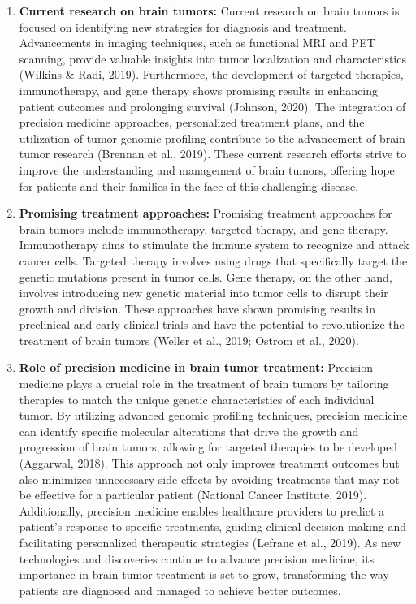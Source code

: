 \documentclass[12pt,oneside]{report}
\begin{document}
\begin{enumerate}
\item \textbf{Current research on brain tumors:}
Current research on brain tumors is focused on identifying new strategies for diagnosis and treatment. 
Advancements in imaging techniques, such as functional MRI and PET scanning, provide valuable 
insights into tumor localization and characteristics (Wilkins \& Radi, 2019). Furthermore, the development 
of targeted therapies, immunotherapy, and gene therapy shows promising results in enhancing patient 
outcomes and prolonging survival (Johnson, 2020). The integration of precision medicine approaches, 
personalized treatment plans, and the utilization of tumor genomic profiling contribute to the advancement 
of brain tumor research (Brennan et al., 2019). These current research efforts strive to improve the 
understanding and management of brain tumors, offering hope for patients and their families in the face 
of this challenging disease.

\item \textbf{Promising treatment approaches:}
Promising treatment approaches for brain tumors include immunotherapy, targeted therapy, and gene 
therapy. Immunotherapy aims to stimulate the immune system to recognize and attack cancer cells. 
Targeted therapy involves using drugs that specifically target the genetic mutations present in tumor cells. 
Gene therapy, on the other hand, involves introducing new genetic material into tumor cells to disrupt 
their growth and division. These approaches have shown promising results in preclinical and early clinical 
trials and have the potential to revolutionize the treatment of brain tumors (Weller et al., 2019; Ostrom et 
al., 2020).

\item \textbf{Role of precision medicine in brain tumor treatment:}
Precision medicine plays a crucial role in the treatment of brain tumors by tailoring therapies to match 
the unique genetic characteristics of each individual tumor. By utilizing advanced genomic profiling 
techniques, precision medicine can identify specific molecular alterations that drive the growth and 
progression of brain tumors, allowing for targeted therapies to be developed (Aggarwal, 2018). This 
approach not only improves treatment outcomes but also minimizes unnecessary side effects by avoiding 
treatments that may not be effective for a particular patient (National Cancer Institute, 2019). Additionally, 
precision medicine enables healthcare providers to predict a patient's response to specific treatments, 
guiding clinical decision-making and facilitating personalized therapeutic strategies (Lefranc et al., 2019). 
As new technologies and discoveries continue to advance precision medicine, its importance in brain 
tumor treatment is set to grow, transforming the way patients are diagnosed and managed to achieve better 
outcomes.

\end{enumerate}
\end{document}
